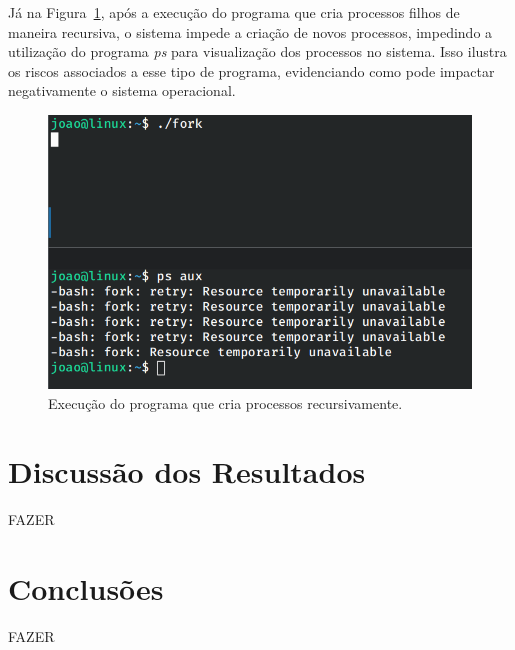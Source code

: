 \documentclass[
	12pt,				%
	oneside,   	        %
	a4paper,			%
	english,			%
	french,				%
	spanish,			%
	brazil,				%
	]{pacotes/abntex2}
\begin{document}
Já na Figura~\ref{fig:bomb}, após a execução do programa que cria processos filhos de maneira recursiva, o sistema impede a criação de novos processos, impedindo a utilização do programa \textit{ps} para visualização dos processos no sistema. Isso ilustra os riscos associados a esse tipo de programa, evidenciando como pode impactar negativamente o sistema operacional.

\begin{figure}[H]
  \centering
  \includegraphics[scale=0.5]{figuras/bomb.png}
  \caption{Execução do programa que cria processos recursivamente.}
  \label{fig:bomb}
\end{figure}

\section{Discussão dos Resultados}
\label{sec:discussao}

FAZER

\section{Conclusões}
\label{sec:conclusoes}

FAZER

\postextual
\renewcommand{\bibsection}{%
\section{\bibname}
\bibmark
\prebibhook}


\end{document}

